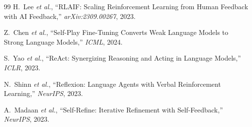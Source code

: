 \documentclass[uplatex,10pt,twocolumn,a4paper]{article}
\newcommand{\etal}{\textit{et al.}}
\begin{document}
\begin{thebibliography}{99}
H.~Lee \etal,
``RLAIF: Scaling Reinforcement Learning from Human Feedback with AI
Feedback,''
\textit{arXiv:2309.00267}, 2023.

Z.~Chen \etal,
``Self-Play Fine-Tuning Converts Weak Language Models to Strong Language
Models,''
\textit{ICML}, 2024.

S.~Yao \etal,
``ReAct: Synergizing Reasoning and Acting in Language Models,''
\textit{ICLR}, 2023.

N.~Shinn \etal,
``Reflexion: Language Agents with Verbal Reinforcement Learning,''
\textit{NeurIPS}, 2023.

A.~Madaan \etal,
``Self-Refine: Iterative Refinement with Self-Feedback,''
\textit{NeurIPS}, 2023.

\end{thebibliography}
\end{document}

